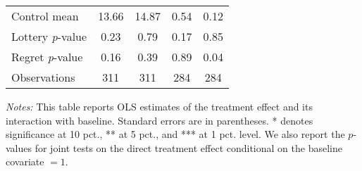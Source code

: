 \begin{table}[ht]
{\begin{threeparttable}
\begin{tabular}{l*{4}{c}}
Control mean    &    13.66         &    14.87         &     0.54         &     0.12         \\
Lottery \emph{p}-value&     0.23         &     0.79         &     0.17         &     0.85         \\
Regret \emph{p}-value&     0.16         &     0.39         &     0.89         &     0.04         \\
Observations    &      311         &      311         &      284         &      284         \\
\bottomrule \end{tabular} \begin{tablenotes}[flushleft] \footnotesize \item \emph{Notes:} This table reports OLS estimates of the treatment effect and its interaction with baseline. Standard errors are in parentheses. * denotes significance at 10 pct., ** at 5 pct., and *** at 1 pct. level. We also report the \(p\)-values for joint tests on the direct treatment effect conditional on the baseline covariate $= 1$. \end{tablenotes} \end{threeparttable} } \end{table}

